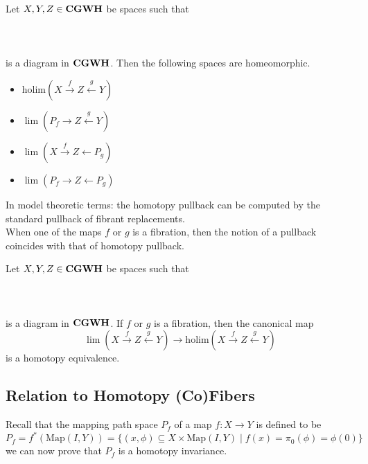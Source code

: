 \documentclass[a4paper]{article}
\begin{document}
\begin{prp}{}{} Let $X,Y,Z\in\bold{CGWH}$ be spaces such that \\~\\
\\~\\
is a diagram in $\bold{CGWH}$. Then the following spaces are homeomorphic. 
\begin{itemize}
\item $\text{holim}(X\overset{f}{\rightarrow}Z\overset{g}{\leftarrow}Y)$
\item $\lim(P_f\rightarrow Z\overset{g}{\leftarrow}Y)$
\item $\lim(X\overset{f}{\rightarrow}Z\leftarrow P_g)$
\item $\lim(P_f\rightarrow Z\leftarrow P_g)$
\end{itemize}
\end{prp}

In model theoretic terms: the homotopy pullback can be computed by the standard pullback of fibrant replacements. \\

When one of the maps $f$ or $g$ is a fibration, then the notion of a pullback coincides with that of homotopy pullback. 

\begin{prp}{}{} Let $X,Y,Z\in\bold{CGWH}$ be spaces such that \\~\\
\\~\\
is a diagram in $\bold{CGWH}$. If $f$ or $g$ is a fibration, then the canonical map $$\lim(X\overset{f}{\rightarrow}Z\overset{g}{\leftarrow}Y)\to\text{holim}(X\overset{f}{\rightarrow}Z\overset{g}{\leftarrow}Y)$$ is a homotopy equivalence. 
\end{prp}

\subsection{Relation to Homotopy (Co)Fibers}
Recall that the mapping path space $P_f$ of a map $f:X\to Y$ is defined to be $$P_f=f^\ast(\text{Map}(I,Y))=\{(x,\phi)\subseteq X\times\text{Map}(I,Y)\;|\;f(x)=\pi_0(\phi)=\phi(0)\}$$ we can now prove that $P_f$ is a homotopy invariance. 
\end{document}
